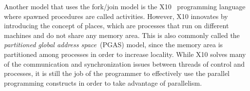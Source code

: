 Another model that uses the fork/join model is the
X10~\cite{Charles:2005:XOA:1094811.1094852} programming language where spawned
procedures are called activities. However, X10 innovates by introducing the
concept of places, which are processes that run on different machines and do not
share any memory area. This is also commonly called the \emph{partitioned global
address space}~(PGAS) model, since the memory area is partitioned among
processes in order to increase locality. While X10 solves many of the
communication and synchronization issues between threads of control and
processes, it is still the job of the programmer to effectively use the parallel
programming constructs in order to take advantage of parallelism.
